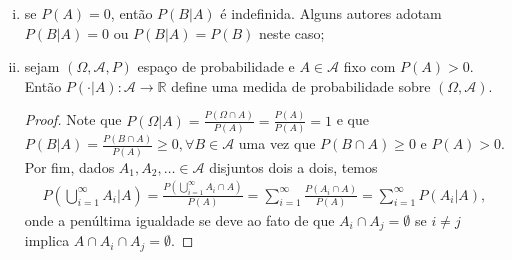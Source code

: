 \documentclass[../Notas.tex]{subfiles}
\begin{document}
\begin{remarks}
\begin{enumerate}[(i)]
    \item se $P(A) = 0$, então $P(B|A)$ é indefinida. Alguns autores adotam $P(B|A) = 0$ ou $P(B|A) = P(B)$ neste caso;
    \item sejam $(\Omega, \mathcal{A}, P)$ espaço de probabilidade e $A\in\mathcal{A}$ fixo com $P(A) > 0$. Então $P(\cdot|A):\mathcal{A}\to\mathbb{R}$ define uma medida de probabilidade sobre $(\Omega, \mathcal{A})$.
    \begin{proof}
    Note que $P(\Omega|A) = \displaystyle{ \frac{P(\Omega\cap A)}{P(A)} = \frac{P(A)}{P(A)} = 1 }$ e que $P(B|A) = \displaystyle{\frac{P(B\cap A)}{P(A)}} \geq 0, \forall B\in\mathcal{A}$ uma vez que $P(B\cap A)\geq 0$ e $P(A) > 0$. Por fim, dados $A_1, A_2, \dots\in\mathcal{A}$ disjuntos dois a dois, temos
    \begin{align*}
        P\left( \bigcup_{i=1}^{\infty}A_i | A \right) = \frac{P\left( \bigcup_{i=1}^{\infty}A_i \cap A \right)}{P(A)} = \sum_{i=1}^{\infty}\frac{P(A_i\cap A)}{P(A)} = \sum_{i=1}^{\infty}P(A_i|A),
    \end{align*}
    onde a penúltima igualdade se deve ao fato de que $A_i\cap A_j = \emptyset$ se $i\neq j$ implica $A\cap A_i\cap A_j = \emptyset.$
    \end{proof}
\end{enumerate}
\end{remarks}
\end{document}
